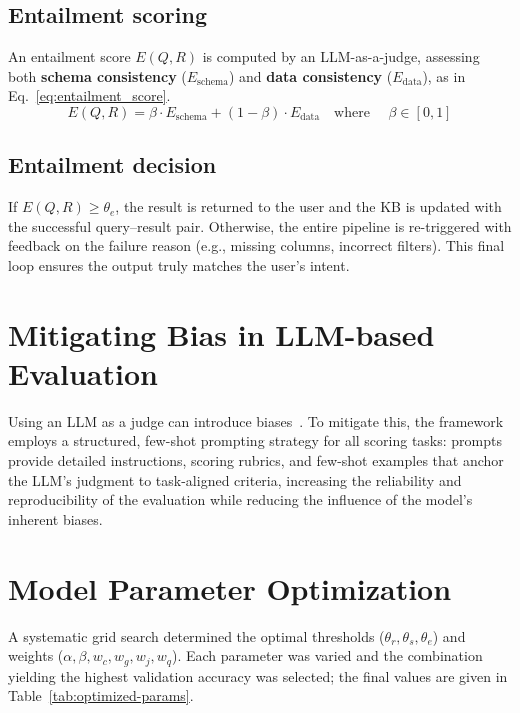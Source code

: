 \subsection{Entailment scoring}
An entailment score $E(Q, R)$ is computed by an LLM-as-a-judge, assessing both \textbf{schema consistency} ($E_{\text{schema}}$) and \textbf{data consistency} ($E_{\text{data}}$), as in Eq.~\ref{eq:entailment_score}.
\begin{equation} \label{eq:entailment_score}
E(Q, R) = \beta \cdot E_{\text{schema}} + (1 - \beta) \cdot E_{\text{data}} \quad \text{where } \quad \beta \in [0,1]
\end{equation}

\subsection{Entailment decision}
If $E(Q, R) \geq \theta_e$, the result is returned to the user and the KB is updated with the successful query--result pair. Otherwise, the entire pipeline is re-triggered with feedback on the failure reason (e.g., missing columns, incorrect filters). This final loop ensures the output truly matches the user's intent.

\section{Mitigating Bias in LLM-based Evaluation}
Using an LLM as a judge can introduce biases~\cite{zheng2023judging}. To mitigate this, the framework employs a structured, few-shot prompting strategy for all scoring tasks: prompts provide detailed instructions, scoring rubrics, and few-shot examples that anchor the LLM's judgment to task-aligned criteria, increasing the reliability and reproducibility of the evaluation while reducing the influence of the model's inherent biases.

\section{Model Parameter Optimization}
\label{sec:parameters}
A systematic grid search determined the optimal thresholds ($\theta_r, \theta_s, \theta_e$) and weights ($\alpha, \beta, w_c, w_g, w_j, w_q$). Each parameter was varied and the combination yielding the highest validation accuracy was selected; the final values are given in Table~\ref{tab:optimized-params}.

